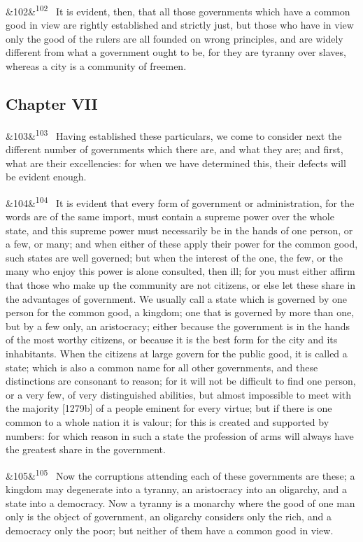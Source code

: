 \documentclass[12pt]{article}
\newcommand{\para}[1][]{\par\noindent\ifx&#1&\else\textsuperscript{\footnotesize #1}~\fi}
\begin{document}
\para[102] It is evident, then, that all those governments which have a common good in view are rightly established and strictly just, but those who have in view only the good of the rulers are all founded on wrong principles, and are widely different from what a government ought to be, for they are tyranny over slaves, whereas a city is a community of freemen.

\subsection*{Chapter VII}

\para[103] Having established these particulars, we come to consider next the different number of governments which there are, and what they are; and first, what are their excellencies: for when we have determined this, their defects will be evident enough.

\para[104] It is evident that every form of government or administration, for the words are of the same import, must contain a supreme power over the whole state, and this supreme power must necessarily be in the hands of one person, or a few, or many; and when either of these apply their power for the common good, such states are well governed; but when the interest of the one, the few, or the many who enjoy this power is alone consulted, then ill; for you must either affirm that those who make up the community are not citizens, or else let these share in the advantages of government. We usually call a state which is governed by one person for the common good, a kingdom; one that is governed by more than one, but by a few only, an aristocracy; either because the government is in the hands of the most worthy citizens, or because it is the best form for the city and its inhabitants. When the citizens at large govern for the public good, it is called a state; which is also a common name for all other governments, and these distinctions are consonant to reason; for it will not be difficult to find one person, or a very few, of very distinguished abilities, but almost impossible to meet with the majority [1279b] of a people eminent for every virtue; but if there is one common to a whole nation it is valour; for this is created and supported by numbers: for which reason in such a state the profession of arms will always have the greatest share in the government.

\para[105] Now the corruptions attending each of these governments are these; a kingdom may degenerate into a tyranny, an aristocracy into an oligarchy, and a state into a democracy. Now a tyranny is a monarchy where the good of one man only is the object of government, an oligarchy considers only the rich, and a democracy only the poor; but neither of them have a common good in view.
\end{document}
